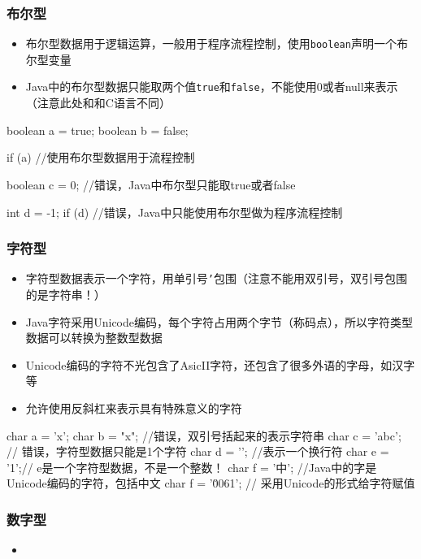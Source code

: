 \begin{frame}[fragile]
  \frametitle{布尔型}
  \begin{itemize}
    \item 布尔型数据用于逻辑运算，一般用于程序流程控制，使用\texttt{boolean}声明一个布尔型变量
    \item Java中的布尔型数据只能取两个值\texttt{true}和\texttt{false}，不能使用0或者null来表示（注意此处和和C语言不同）
  \end{itemize}
  \begin{javacode}
    boolean a = true;
    boolean b = false;
    
    if (a) { //使用布尔型数据用于流程控制
    }
    
    boolean c = 0; //错误，Java中布尔型只能取true或者false
    
    int d = -1;
    if (d) { //错误，Java中只能使用布尔型做为程序流程控制
    }
  \end{javacode}
\end{frame}

\begin{frame}[fragile]
  \frametitle{字符型}
  \begin{itemize}
    \item 字符型数据表示一个字符，用单引号\texttt{'}包围（注意不能用双引号，双引号包围的是字符串！）
    \item Java字符采用Unicode编码，每个字符占用两个字节（称码点），所以字符类型数据可以转换为整数型数据
    \item Unicode编码的字符不光包含了AsicII字符，还包含了很多外语的字母，如汉字等
    \item 允许使用反斜杠来表示具有特殊意义的字符
  \end{itemize}
  \begin{javacode}
    char a = 'x';
    char b = "x"; //错误，双引号括起来的表示字符串
    char c = 'abc'; // 错误，字符型数据只能是1个字符
    char d = '\n'; //表示一个换行符
    char e = '1';// e是一个字符型数据，不是一个整数！
    char f = '中'; //Java中的字是Unicode编码的字符，包括中文
    char f = '\u0061'; // 采用Unicode的形式给字符赋值
  \end{javacode}
\end{frame}

\begin{frame}
  \frametitle{数字型}
  \begin{itemize}
    \item 
  \end{itemize}
\end{frame}

